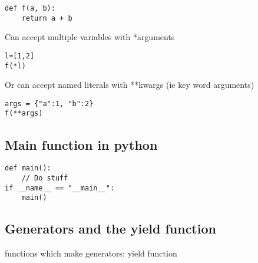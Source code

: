 \begin{verbatim}
def f(a, b):
    return a + b
\end{verbatim}

Can accept multiple variables with *arguments

\begin{verbatim}
l=[1,2]
f(*l)
\end{verbatim}

Or can accept named literals with **kwargs (ie key word arguments)

\begin{verbatim}
args = {"a":1, "b":2}
f(**args)
\end{verbatim}

\subsection{Main function in python}

\begin{verbatim}
def main():
    // Do stuff
if __name__ == "__main__":
    main()
\end{verbatim}

\subsection{Generators and the yield function}

functions which make generators: yield function


